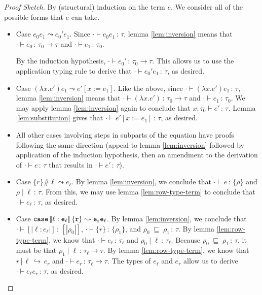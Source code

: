 \documentclass{article}
\newcommand{\variant}[1]{[\!|#1|\!]}
\newcommand{\case}[2]{\tt{case}\,#1\,#2}
\newcommand{\hastp}[3]{#1 \vdash #2 \,:\, #3}
\newcommand{\haslbl}[3]{#1\;|\;#2\,:\, #3}
\newcommand{\caseVarRcd}[3]{#1 \;\sqsubseteq\; #2 \,:\, #3}
\newcommand{\haslbltm}[3]{#1\,|\,#2\,\hookrightarrow\, #3}
\newcommand{\step}[2]{#1 \leadsto #2}
\begin{document}
\begin{proof}[Proof Sketch]
By (structural) induction on the term $e$. We consider all of the possible forms
that \(e\) can take.

\begin{itemize}
  \item Case \(\step {e_0 e_1} {e_0' e_1}\). Since \(\hastp \cdot {e_0 e_1}
    \tau\), lemma \ref{lem:inversion} means that \(\hastp \cdot {e_0} {\tau_0
      \to \tau}\) and \(\hastp \cdot {e_1} {\tau_0}\).

    By the induction hypothesis, \(\hastp \cdot {e_0'} {\tau_0 \to \tau}\). This
    allows us to use the application typing rule to derive that \(\hastp \cdot
    {e_0' e_1} \tau\), as desired.
  \item Case \(\step {(\lambda x. e')e_1} {e'[x:=e_1]}\). Like the above, since
    \(\hastp \cdot {(\lambda x.e') e_1} \tau\), lemma \ref{lem:inversion} means
    that \(\hastp \cdot {(\lambda x.e')} {\tau_0 \to \tau}\) and \(\hastp \cdot
    {e_1} {\tau_0}\). We may apply lemma \ref{lem:inversion} again to conclude
    that \(\hastp {x : \tau_0} {e'} \tau\). Lemma \ref{lem:substitution} gives
    that \(\hastp \cdot {e'[x:=e_1]} \tau\), as desired.
  \item All other cases involving steps in subparts of the equation have proofs
    following the same direction (appeal to lemma \ref{lem:inversion} followed
    by application of the induction hypothesis, then an amendment to the
    derivation of \(\hastp \cdot e \tau\) that results in \(\hastp \cdot {e'}
    \tau\)).
  \item Case \(\step {\{r\} \# \ell} {e_\ell}\). By lemma \ref{lem:inversion},
    we conclude that \(\hastp \cdot e {\{\rho\}}\) and \(\haslbl \rho \ell
    \tau\). From this, we may use lemma \ref{lem:row-type-term} to conclude that
    \(\hastp \cdot {e_\ell} \tau\), as desired.
  \item Case \(\step {\case {\variant {\ell : e_\ell}} {\{r\}}} {e_r e_\ell}\).
    By lemma \ref{lem:inversion}, we conclude that \(\hastp \cdot {\variant
      {\ell : e_\ell}} {\variant {\rho_0}}\), \(\hastp \cdot {\{r\}}
    {\{\rho_1\}}\), and \(\caseVarRcd {\rho_0} {\rho_1} \tau\). By lemma
    \ref{lem:row-type-term}, we know that \(\hastp \cdot {e_\ell} {\tau_\ell}\)
    and \(\haslbl {\rho_0} \ell {\tau_\ell}\). Because \(\caseVarRcd {\rho_0}
    {\rho_1} \tau\), it must be that \(\haslbl {\rho_1} \ell {\tau_\ell \to
      \tau}\). By lemma \ref{lem:row-type-term}, we know that \(\haslbltm r \ell
    {e_r}\) and \(\hastp \cdot {e_r} {\tau_\ell \to \tau}\). The types of
    \(e_\ell\) and \(e_r\) allow us to derive \(\hastp \cdot {e_\ell e_r}
    \tau\), as desired.
\end{itemize}

\end{proof}
\end{document}
